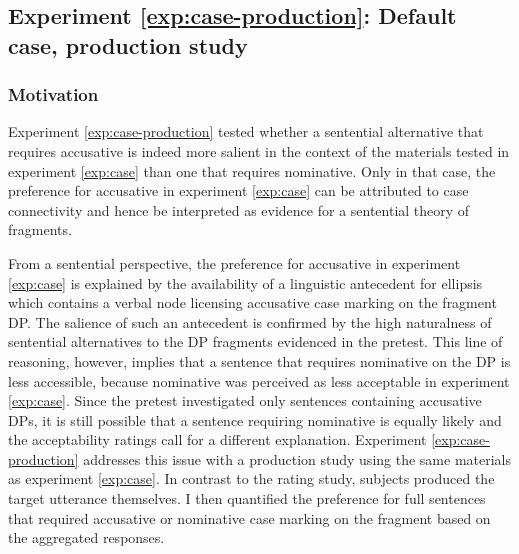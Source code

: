 \label{exp:case-production}
\subsection{Experiment \ref{exp:case-production}: Default case, production study}
\label{sec:fragments-case-followup}
\subsubsection{Motivation}

Experiment \ref{exp:case-production} tested whether a sentential alternative that requires accusative is indeed more salient in the context of the materials tested in experiment \ref{exp:case} than one that requires nominative. Only in that case, the preference for accusative in experiment \ref{exp:case} can be attributed to case connectivity and hence be interpreted as evidence for a sentential theory of fragments.

From a sentential perspective, the preference for accusative in experiment \ref{exp:case} is explained by the availability of a linguistic antecedent for ellipsis which contains a verbal node licensing accusative case marking on the fragment DP. The salience of such an antecedent is confirmed by the high naturalness of sentential alternatives to the DP fragments evidenced in the pretest. This line of reasoning, however, implies that a sentence that requires nominative on the DP is less accessible, because nominative was perceived as less acceptable in experiment \ref{exp:case}. Since the pretest investigated only sentences containing accusative DPs, it is still possible that a sentence requiring nominative is equally likely and the acceptability ratings call for a different explanation. Experiment \ref{exp:case-production} addresses this issue with a production study using the same materials as experiment \ref{exp:case}. In contrast to the rating study, subjects produced the target utterance themselves. I then quantified the preference for full sentences that required accusative or nominative case marking on the fragment based on the aggregated responses.

